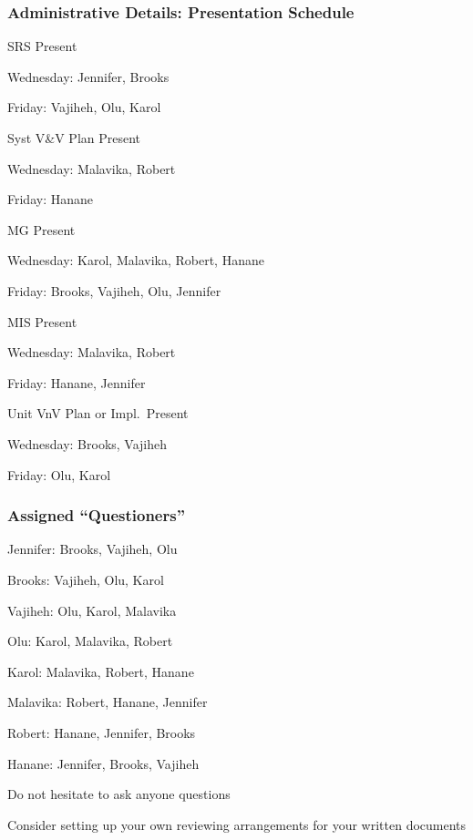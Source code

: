 \documentclass[t,12pt,numbers,fleqn]{beamer}
\begin{document}
\begin{frame}
\frametitle{Administrative Details: Presentation Schedule}

\bi
\item SRS Present
\bi
\item Wednesday: Jennifer, Brooks
\item Friday: Vajiheh, Olu, Karol
\ei
\item Syst V\&V Plan Present
\bi
\item Wednesday: Malavika, Robert
\item Friday: Hanane
\ei
\item MG Present
\bi
\item Wednesday: Karol, Malavika, Robert, Hanane
\item Friday: Brooks, Vajiheh, Olu, Jennifer
\ei
\item MIS Present
\bi
\item Wednesday: Malavika, Robert
\item Friday: Hanane,  Jennifer
\ei
\item Unit VnV Plan or Impl.\ Present
\bi
\item Wednesday: Brooks, Vajiheh
\item Friday: Olu, Karol
\ei

\ei

\end{frame}


\begin{frame}
\frametitle{Assigned ``Questioners''}

\be
\item Jennifer: Brooks, Vajiheh, Olu
\item Brooks: Vajiheh, Olu, Karol
\item Vajiheh: Olu, Karol, Malavika
\item Olu: Karol, Malavika, Robert
\item Karol: Malavika, Robert, Hanane
\item Malavika: Robert, Hanane, Jennifer
\item Robert: Hanane, Jennifer, Brooks
\item Hanane: Jennifer, Brooks, Vajiheh
\ee
\bi
\item Do not hesitate to ask anyone questions
\item Consider setting up your own reviewing arrangements for your written
  documents
\ei
\end{frame}

\end{document}

